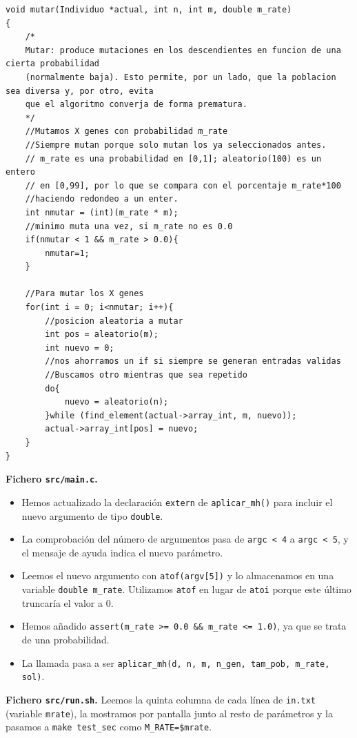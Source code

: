 \documentclass[12pt]{article}
\begin{document}
\begin{enumerate}
\begin{lstlisting}[style=EstiloC]
void mutar(Individuo *actual, int n, int m, double m_rate)
{
	/*
	Mutar: produce mutaciones en los descendientes en funcion de una cierta probabilidad
	(normalmente baja). Esto permite, por un lado, que la poblacion sea diversa y, por otro, evita
	que el algoritmo converja de forma prematura.
	*/
	//Mutamos X genes con probabilidad m_rate
	//Siempre mutan porque solo mutan los ya seleccionados antes.
	// m_rate es una probabilidad en [0,1]; aleatorio(100) es un entero
	// en [0,99], por lo que se compara con el porcentaje m_rate*100 
    //haciendo redondeo a un enter.
	int nmutar = (int)(m_rate * m);
	//minimo muta una vez, si m_rate no es 0.0
	if(nmutar < 1 && m_rate > 0.0){
		nmutar=1;
	}
	
	//Para mutar los X genes
	for(int i = 0; i<nmutar; i++){
		//posicion aleatoria a mutar
		int pos = aleatorio(m);
		int nuevo = 0;
		//nos ahorramos un if si siempre se generan entradas validas
		//Buscamos otro mientras que sea repetido
		do{
			nuevo = aleatorio(n);
		}while (find_element(actual->array_int, m, nuevo));
		actual->array_int[pos] = nuevo;
	}
}
\end{lstlisting}

\textbf{Fichero \texttt{src/main.c}.}

\begin{itemize}
    \item Hemos actualizado la declaración \texttt{extern} de \texttt{aplicar\_mh()} para incluir el nuevo argumento de tipo \texttt{double}.
    \item La comprobación del número de argumentos pasa de \texttt{argc < 4} a \texttt{argc < 5}, y el mensaje de ayuda indica el nuevo parámetro.
    \item Leemos el nuevo argumento con \texttt{atof(argv[5])} y lo almacenamos en una variable \texttt{double m\_rate}. Utilizamos \texttt{atof} en lugar de \texttt{atoi} porque este último truncaría el valor a 0.
    \item Hemos añadido \texttt{assert(m\_rate >= 0.0 \&\& m\_rate <= 1.0)}, ya que se trata de una probabilidad.
    \item La llamada pasa a ser \texttt{aplicar\_mh(d, n, m, n\_gen, tam\_pob, m\_rate, sol)}.
\end{itemize}

\textbf{Fichero \texttt{src/run.sh}.} Leemos la quinta columna de cada línea de \texttt{in.txt} (variable \texttt{mrate}), la mostramos por pantalla junto al
resto de parámetros y la pasamos a \texttt{make test\_sec} como \texttt{M\_RATE=\$mrate}.


\end{enumerate}
\end{document}
